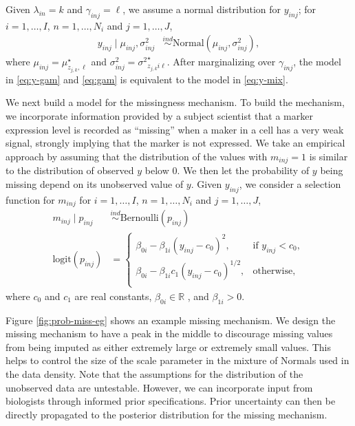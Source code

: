 \documentclass[12pt,]{article}
\newcommand{\p}[1]{\left(#1\right)}
\newcommand{\ind}{\overset{ind}{\sim}}
\def\logit{\text{logit}}
\def\Bern{\text{Bernoulli}}
\def\Prob{\text{Pr}}
\begin{document}
Given \(\lambda_{in}=k\) and \(\gamma_{inj}=\ell\), we assume a normal
distribution for \(y_{inj}\); for \(i=1, \ldots, I\),
\(n=1, \ldots, N_i\) and \(j=1, \ldots, J\),
\begin{align}
  y_{inj} \mid \mu_{inj}, \sigma^2_{inj}  &\ind \text{Normal}(\mu_{inj}, \sigma^2_{inj}), \label{eq:y-gam}
\end{align}
where \(\mu_{inj} = \mu^\star_{z_{j,k},\ell}\) and \(\sigma^2_{inj} =
{\sigma^{2}}^\star_{z_{j,k}i\ell}\). After marginalizing over $\gamma_{inj}$,
the model in \eqref{eq:y-gam} and \eqref{eq:gam} is equivalent to the model in
\eqref{eq:y-mix}.  

We next build a model for the missingness mechanism.  To build the mechanism,
we incorporate information provided by a subject scientist that a marker
expression level is recorded as ``missing'' when a maker in a cell has a very
weak signal, strongly implying that the marker is not expressed.  We take an
empirical approach by assuming that the distribution of the values with
$m_{inj}=1$ is similar to the distribution of observed $y$ below 0. We then let
the probability of $y$ being missing depend on its unobserved value of $y$.
%
Given
\(y_{inj}\), we consider a selection function for \(m_{inj}\) for
\(i=1, \ldots, I\), \(n=1, \ldots, N_i\) and \(j=1, \ldots, J\),
\begin{align}
  m_{inj} \mid p_{inj} &\ind \Bern(p_{inj}) \label{eq:missing} \\
  \logit(p_{inj}) &= \begin{cases}
  \beta_{0i} - \beta_{1i}(y_{inj}-c_0)^2, & \text{if } y_{inj} < c_0\nonumber, \\
  \beta_{0i} - \beta_{1i}c_1\p{y_{inj}-c_0}^{1/2}, & \text{otherwise}, \nonumber \\
  \end{cases} 
\end{align}
where \(c_0\) and \(c_1\) are real constants, $\beta_{0i} \in \mathbb{R}$ , and
$\beta_{1i} > 0$.

Figure \ref{fig:prob-miss-eg} shows an example missing mechanism. We design the
missing mechanism to have a peak in the middle to discourage missing values
from being imputed as either extremely large or extremely small values. This
helps to control the size of the scale parameter in the mixture of Normals used
in the data density. Note that the assumptions for the distribution of the
unobserved data are untestable. However, we can incorporate input from
biologists through informed prior specifications. Prior uncertainty can then be
directly propagated to the posterior distribution for the missing mechanism.
\end{document}
